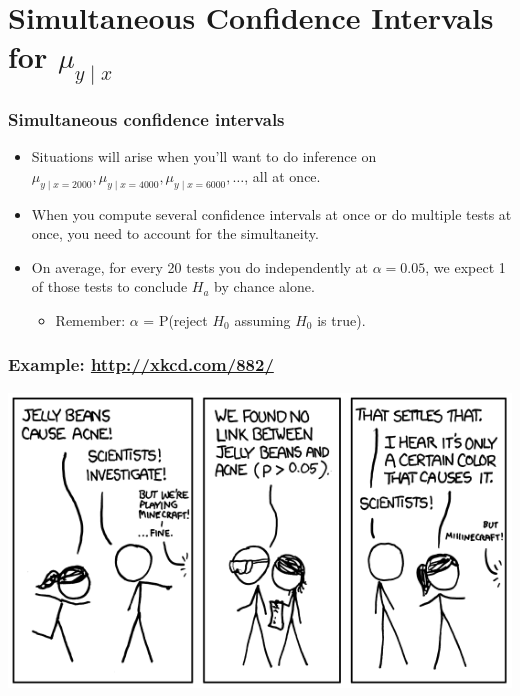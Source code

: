 \documentclass[handout]{beamer}\usepackage[]{graphicx}\usepackage[]{color}
\numberwithin{equation}{section}
\begin{document}
\section{Simultaneous Confidence Intervals for $\mu_{y \mid x}$}

\begin{frame}
\frametitle{Simultaneous confidence intervals}
\begin{itemize}
\item Situations will arise when you'll want to do inference on $\mu_{y \mid x = 2000}, \mu_{y \mid x = 4000}, \mu_{y \mid x = 6000}, \ldots$, all at once.
\pause \item When you compute several confidence intervals at once or do multiple tests at once, you need to account for the simultaneity.
\pause \item On average, for every 20 tests you do independently at $\alpha = 0.05$,  we expect 1 of those tests to conclude $H_a$ by chance alone.
\begin{itemize}
\pause \item Remember: $\alpha$ = P(reject $H_0$ assuming $H_0$ is true).
\end{itemize}
\end{itemize}
\end{frame}


\begin{frame}
\frametitle{Example: \url{http://xkcd.com/882/}}
 \includegraphics{../../fig/xkcd1.png}
\end{frame}
\end{document}
